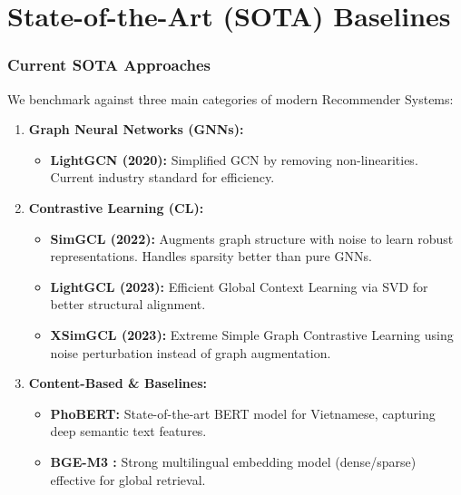 \documentclass{beamer}
\begin{document}
\section{State-of-the-Art (SOTA) Baselines}
\begin{frame}
    \frametitle{Current SOTA Approaches}
    We benchmark against three main categories of modern Recommender Systems:
    \vspace{0.2cm}
    \begin{enumerate}
        \item \textbf{Graph Neural Networks (GNNs):}
              \begin{itemize}
                  \item \textbf{LightGCN \cite{he2020lightgcn} (2020):} Simplified GCN by removing non-linearities. Current industry standard for efficiency.
              \end{itemize}

              \vspace{0.2cm}
        \item \textbf{Contrastive Learning (CL):}
              \begin{itemize}
                  \item \textbf{SimGCL \cite{yu2022graph} (2022):} Augments graph structure with noise to learn robust representations. Handles sparsity better than pure GNNs.
                  \item \textbf{LightGCL \cite{cai2023lightgcl} (2023):} Efficient Global Context Learning via SVD for better structural alignment.
                  \item \textbf{XSimGCL \cite{yu2023xsimgcl} (2023):} Extreme Simple Graph Contrastive Learning using noise perturbation instead of graph augmentation.
              \end{itemize}

              \vspace{0.2cm}
        \item \textbf{Content-Based \& Baselines:}
              \begin{itemize}
                  \item \textbf{PhoBERT:} State-of-the-art BERT model for Vietnamese, capturing deep semantic text features.
                  \item \textbf{BGE-M3 \cite{xiao2023bgem3}:} Strong multilingual embedding model (dense/sparse) effective for global retrieval.
              \end{itemize}
    \end{enumerate}
\end{frame}
\end{document}
